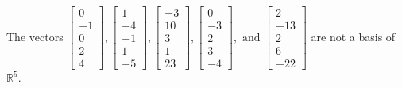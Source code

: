 \begin{exercise}
\begin{exerciseStatement}
  \end{exerciseStatement}
  \begin{exerciseAnswer}
   The vectors \(\left[\begin{array}{r}
0 \\
-1 \\
0 \\
2 \\
4
\end{array}\right] , \left[\begin{array}{r}
1 \\
-4 \\
-1 \\
1 \\
-5
\end{array}\right] , \left[\begin{array}{r}
-3 \\
10 \\
3 \\
1 \\
23
\end{array}\right] , \left[\begin{array}{r}
0 \\
-3 \\
2 \\
3 \\
-4
\end{array}\right] , \text{ and } \left[\begin{array}{r}
2 \\
-13 \\
2 \\
6 \\
-22
\end{array}\right]\) 
  	 are not  a basis of \(\mathbb{R}^5\).
  


  \end{exerciseAnswer}
\end{exercise}
